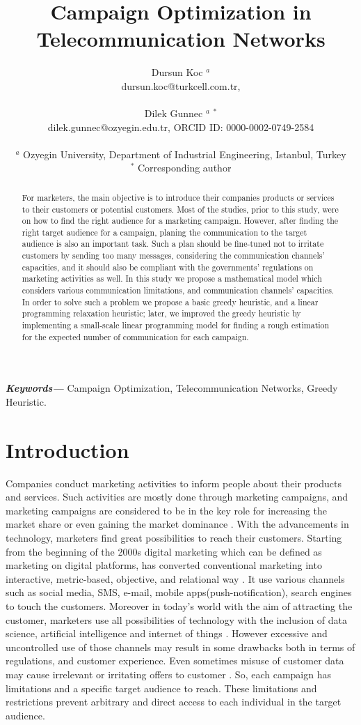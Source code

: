 \documentclass[11pt]{article}
\title{Campaign Optimization in Telecommunication Networks\\}
\author{Dursun Koc $^{a}$ \\ 
	dursun.koc@turkcell.com.tr, \\\\
	Dilek Gunnec $^{a}$ $^{\ast}$\\ 
	dilek.gunnec@ozyegin.edu.tr, ORCID ID: 0000-0002-0749-2584 \\\\
$^{a}$ Ozyegin University, Department of Industrial Engineering, Istanbul, Turkey \\ 
$^{\ast}$ Corresponding author \\ }
\date{}
\providecommand{\keywords}[1]
{
  \small	
  \textbf{\textit{Keywords---}} #1
}
\begin{document}
\maketitle
\begin{abstract}
For marketers, the main objective is to introduce their companies products or services to their customers or potential customers. Most of the studies, prior to this study, were on how to find the right audience for a marketing campaign. However, after finding the right target audience for a campaign, planing the communication to the target audience is also an important task. Such a plan should be fine-tuned not to irritate customers by sending too many messages, considering the communication channels' capacities, and it should also be compliant with the governments' regulations on marketing activities as well. In this study we propose a mathematical model which considers various communication limitations, and communication channels' capacities. In order to solve such a problem we propose a basic greedy heuristic, and a linear programming relaxation heuristic; later, we improved the greedy heuristic by implementing a small-scale linear programming model for finding a rough estimation for the expected number of communication for each campaign.\end{abstract}\hspace{10pt}

\keywords{Campaign Optimization, Telecommunication Networks, Greedy Heuristic.}

\newpage

\section{Introduction}

Companies conduct marketing activities to inform people about their products and services. Such activities are mostly done through marketing campaigns, and marketing campaigns are considered to be in the key role for increasing the market share or even gaining the market dominance \citep{xiao}. With the advancements in technology, marketers find great possibilities to reach their customers. Starting from the beginning of the 2000s digital marketing which can be defined as marketing on digital platforms, has converted conventional marketing into interactive, metric-based, objective, and relational way \citep{krishen}. It use various channels such as social media, SMS, e-mail, mobile apps(push-notification), search engines to touch the customers. Moreover in today's world with the aim of attracting the customer, marketers use all possibilities of technology with the inclusion of data science, artificial intelligence and internet of things \citep{buhalis}. However excessive and uncontrolled use of those channels may result in some drawbacks both in terms of regulations, and customer experience. Even sometimes misuse of customer data may cause irrelevant or irritating offers to customer \citep{malthouse}. So, each campaign has limitations and a specific target audience to reach. These limitations and restrictions prevent arbitrary and direct access to each individual in the target audience.\\
\end{document}

